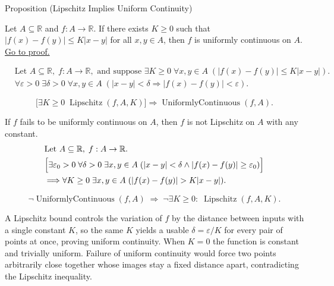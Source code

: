 \begin{propositionbox}{Proposition (Lipschitz Implies Uniform Continuity)}
\begin{proposition}
\label{prop:lipschitz-implies-uc}
Let $A \subseteq \mathbb{R}$ and $f:A \to \mathbb{R}$. If there exists $K \ge 0$ such that $|f(x)-f(y)| \le K |x-y|$ for all $x,y \in A$, then $f$ is uniformly continuous on $A$.
\hyperref[prf:lipschitz-implies-uc]{Go to proof.}
\end{proposition}
\end{propositionbox}

\begin{remark*}
\[
\begin{aligned}
&\text{Let } A \subseteq \mathbb{R},\; f:A \to \mathbb{R},\text{ and suppose }\exists K \ge 0\;\forall x,y \in A\;( |f(x)-f(y)| \le K |x-y|).\\
&\forall \varepsilon > 0\;\exists \delta > 0\;\forall x,y \in A\;(|x-y| < \delta \Rightarrow |f(x)-f(y)| < \varepsilon).
\end{aligned}
\]
\end{remark*}

\begin{remark*}
\[
\bigl[\exists K \ge 0\; \operatorname{Lipschitz}(f,A,K)\bigr] \Rightarrow \operatorname{UniformlyContinuous}(f,A).
\]
\end{remark*}

\begin{remark*}
If $f$ fails to be uniformly continuous on $A$, then $f$ is not Lipschitz on $A$ with any constant.
\[
\begin{aligned}
&\text{Let } A \subseteq \mathbb{R},\; f:A \to \mathbb{R}.\\
&\Bigl[\exists \varepsilon_0>0\;\forall \delta>0\;\exists x,y \in A\;(|x-y|<\delta \land |f(x)-f(y)|\ge\varepsilon_0)\Bigr]\\
&\Longrightarrow \forall K\ge 0\;\exists x,y \in A\;(|f(x)-f(y)|>K|x-y|).
\end{aligned}
\]
\end{remark*}

\begin{remark*}
\[
\neg\operatorname{UniformlyContinuous}(f,A)
\;\Longrightarrow\;
\neg\exists K\ge 0:\;\operatorname{Lipschitz}(f,A,K).
\]
\end{remark*}

\begin{remark*}[Interpretation]
A Lipschitz bound controls the variation of $f$ by the distance between inputs with a single constant $K$, so the same $K$ yields a usable $\delta = \varepsilon/K$ for every pair of points at once, proving uniform continuity. When $K=0$ the function is constant and trivially uniform. Failure of uniform continuity would force two points arbitrarily close together whose images stay a fixed distance apart, contradicting the Lipschitz inequality.
\end{remark*}

